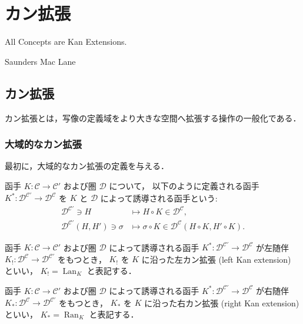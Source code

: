 \documentclass[titlepage]{ltjsreport}
\newcommand{\cat}[1]{\mathscr{#1}}
\newcommand{\objs}[1]{#1}
\newcommand{\mrp}[3]{{#1}:{#2}\to{#3}}
\newcommand{\mrps}[3]{#1(#2,#3)}
\DeclareMathOperator{\lan}{Lan}
\DeclareMathOperator{\ran}{Ran}
\begin{document}
\chapter{カン拡張}

\epigraph{All Concepts are Kan Extensions.}{Saunders Mac Lane}

\section{カン拡張}

カン拡張とは，写像の定義域をより大きな空間へ拡張する操作の一般化である．

\subsection{大域的なカン拡張}

最初に，大域的なカン拡張の定義を与える．

\begin{definition}[函手の誘導]
  \def\C{\cat{C}}%
  \def\A{\cat{C'}}%
  \def\D{\cat{D}}%
  \def\K{K}%
  \def\h{H}%
  函手 $\mrp{\K}{\C}{\A}$ および圏 $\D$ について，
  以下のように定義される函手 $\mrp{\K^*}{\D^\A}{\D^\C}$ を
  $\K$ と $\D$ によって誘導される函手という:
  \begin{align}
    \objs{\D^\A}\ni\h
     & \mapsto\h\circ\K\in\objs{\D^\C},                            \\
    \mrps{\D^\A}{\h}{\h'}\ni\sigma
     & \mapsto\sigma\circ\K\in\mrps{\D^\C}{\h\circ\K}{\h'\circ\K}.
  \end{align}
\end{definition}
\begin{definition}
  \def\C{\cat{C}}%
  \def\A{\cat{C'}}%
  \def\D{\cat{D}}%
  \def\K{K}%
  \def\L{\K_!}%
  函手 $\mrp{\K}{\C}{\A}$ および圏 $\D$ によって誘導される函手
  $\mrp{\K^*}{\D^\A}{\D^\C}$ が左随伴 $\mrp{\L}{\D^\C}{\D^\A}$ をもつとき，
  $\L$ を $\K$ に沿った左カン拡張 (left Kan extension) といい，
  $\L=\lan_{\K}$ と表記する．
\end{definition}
\begin{definition}
  \def\C{\cat{C}}%
  \def\A{\cat{C'}}%
  \def\D{\cat{D}}%
  \def\K{K}%
  \def\R{\K_*}%
  函手 $\mrp{\K}{\C}{\A}$ および圏 $\D$ によって誘導される函手
  $\mrp{\K^*}{\D^\A}{\D^\C}$ が右随伴 $\mrp{\R}{\D^\C}{\D^\A}$ をもつとき，
  $\R$ を $\K$ に沿った右カン拡張 (right Kan extension) といい，
  $\R=\ran_{\K}$ と表記する．
\end{definition}
\end{document}
